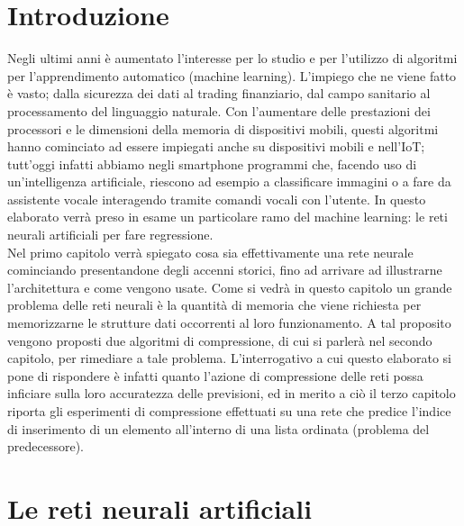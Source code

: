 \documentclass[12pt]{report}
\begin{document}


\tableofcontents

\linespread{1.4}\selectfont

\chapter*{Introduzione}
Negli ultimi anni è aumentato l'interesse per lo studio e per l'utilizzo di algoritmi per l'apprendimento automatico (machine learning). L'impiego che ne viene fatto è vasto; dalla sicurezza dei dati al trading finanziario, dal campo sanitario al processamento del linguaggio naturale. Con l'aumentare delle prestazioni dei processori e le dimensioni della memoria di dispositivi mobili, questi algoritmi hanno cominciato ad essere impiegati anche su dispositivi mobili e nell'IoT; tutt'oggi infatti abbiamo negli smartphone programmi che, facendo uso di un'intelligenza artificiale, riescono ad esempio a classificare immagini o a fare da assistente vocale interagendo tramite comandi vocali con l'utente. 
In questo elaborato verrà preso in esame un particolare ramo del machine learning: le reti neurali artificiali per fare regressione. \\
Nel primo capitolo verrà spiegato cosa sia effettivamente una rete neurale cominciando presentandone degli accenni storici, fino ad arrivare ad illustrarne l'architettura e come vengono usate. Come si vedrà in questo capitolo un grande problema delle reti neurali è la quantità di memoria che viene richiesta per memorizzarne le strutture dati occorrenti al loro funzionamento. A tal proposito vengono proposti due algoritmi di compressione, di cui si parlerà nel secondo capitolo, per rimediare a tale problema. L'interrogativo a cui questo elaborato si pone di rispondere è infatti quanto l'azione di compressione delle reti possa inficiare sulla loro accuratezza delle previsioni, ed in merito a ciò il terzo capitolo riporta gli esperimenti di compressione effettuati su una rete che predice l'indice di inserimento di un elemento all'interno di una lista ordinata (problema del predecessore).

\chapter{Le reti neurali artificiali}
\end{document}
